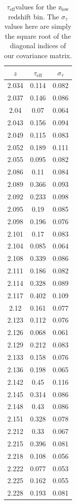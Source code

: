 \documentclass[preprint2,times,tighten]{aastex6}
\newcommand{\teff}{$\tau_\mathrm{eff}$\space}
\newcommand{\loz}{$\mathrm{z_{low}}$\space}
\begin{document}
\begin{table}
\parbox{.45\linewidth}{
\centering
\caption{\teff values for the \loz redshift bin. The $\sigma_{\tau}$ values here are simply the square root of the diagonal indices of our covariance matrix.}
\label{tab:lowz_tab}
\vskip0.1in
\begin{tabular}{ccc}
\hline
\hline
$z$ & \teff & $\sigma_{\tau}$\\
\hline
2.034 & 0.114 & 0.082 \\
2.037 & 0.146 & 0.086 \\
2.04 & 0.07 & 0.064 \\
2.043 & 0.156 & 0.094 \\
2.049 & 0.115 & 0.083 \\
2.052 & 0.189 & 0.111 \\
2.055 & 0.095 & 0.082 \\
2.086 & 0.11 & 0.084 \\
2.089 & 0.366 & 0.093 \\
2.092 & 0.233 & 0.098 \\
2.095 & 0.19 & 0.085 \\
2.098 & 0.196 & 0.076 \\
2.101 & 0.17 & 0.083 \\
2.104 & 0.085 & 0.064 \\
2.108 & 0.339 & 0.086 \\
2.111 & 0.186 & 0.082 \\
2.114 & 0.328 & 0.089 \\
2.117 & 0.402 & 0.109 \\
2.12 & 0.161 & 0.077 \\
2.123 & 0.112 & 0.076 \\
2.126 & 0.068 & 0.061 \\
2.129 & 0.212 & 0.083 \\
2.133 & 0.158 & 0.076 \\
2.136 & 0.198 & 0.065 \\
2.142 & 0.45 & 0.116 \\
2.145 & 0.314 & 0.086 \\
2.148 & 0.43 & 0.086 \\
2.151 & 0.328 & 0.078 \\
2.212 & 0.33 & 0.067 \\
2.215 & 0.396 & 0.081 \\
2.218 & 0.108 & 0.056 \\
2.222 & 0.077 & 0.053 \\
2.225 & 0.162 & 0.055 \\
2.228 & 0.193 & 0.081 \\

\end{tabular}}
\end{table}
\end{document}
